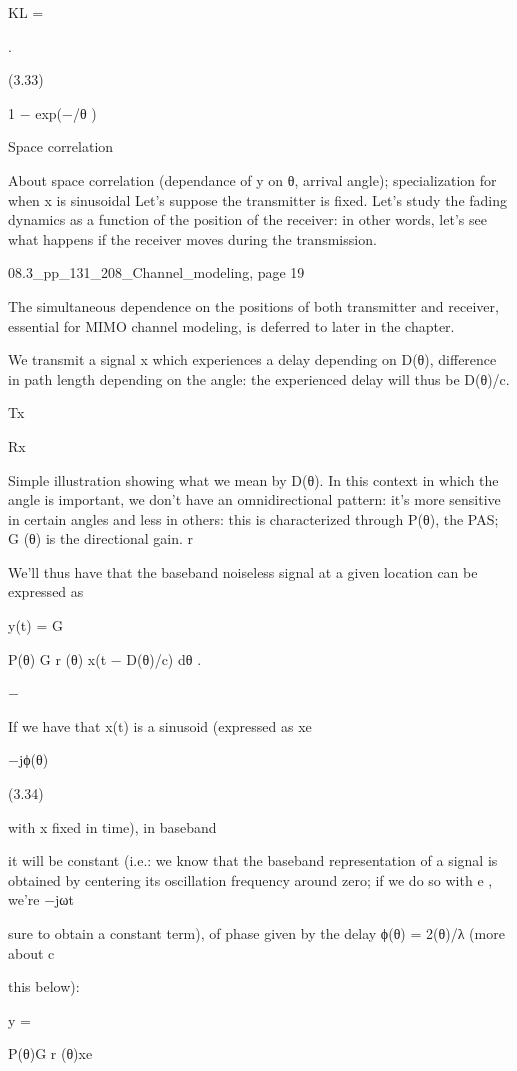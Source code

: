 {{{{KL =

.

(3.33)

1 − exp(−\pi/\sigma θ )

Space correlation

About space correlation (dependance of y on θ, arrival angle);
specialization for when x is sinusoidal Let's suppose the transmitter is fixed. Let's study the fading dynamics as a function of the position of the receiver: in other words, let's see what happens if the receiver moves during the transmission.

08.3_pp_131_208_Channel_modeling, page 19

The simultaneous dependence on the positions of both transmitter and receiver,
essential for MIMO channel modeling, is deferred to later in the chapter.

We transmit a signal x which experiences a delay depending on D(θ), difference in path length depending on the angle: the experienced delay will thus be D(θ)/c.

Tx

Rx

Simple illustration showing what we mean by D(θ).
In this context in which the angle is important, we don't have an omnidirectional pattern: it's more sensitive in certain angles and less in others: this is characterized through P(θ), the PAS; G (θ) is the directional gain.
r

We'll thus have that the baseband noiseless signal at a given location can be expressed as
\pi

y(t) = \sqrt G \int

\sqrt P(θ) G r (θ) x(t − D(θ)/c) dθ .

−\pi

If we have that x(t) is a sinusoid (expressed as xe

−jϕ(θ)

(3.34)

with x fixed in time), in baseband

it will be constant (i.e.: we know that the baseband representation of a signal is obtained by centering its oscillation frequency around zero; if we do so with e
, we're
−jωt

sure to obtain a constant term), of phase given by the delay ϕ(θ) = 2\piD(θ)/λ (more about c

this below):
\pi

y = \sqrtG \int

\sqrt P(θ)G r (θ)xe

}}}}
